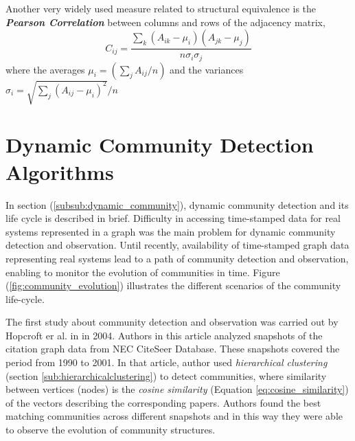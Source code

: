 Another very widely used measure related to structural equivalence is the \textbf{\textit{Pearson Correlation}} between columns and rows of the adjacency matrix,
\begin{equation}
C_{ij} = \dfrac{\sum\limits_{k} (A_{ik} - \mu_i) (A_{jk} - \mu_j)}{n \sigma_i \sigma_j}
\end{equation}
where the averages $\mu_i = (\sum\limits_j A_{ij} / n)$ and the variances $\sigma_i = \sqrt{\sum\limits_j (A_{ij} - \mu_i)^2} / n$

\section{Dynamic Community Detection Algorithms}\label{sec:dynamic_community_algorithms}
In section (\ref{subsub:dynamic_community}), dynamic community detection and its life cycle is described in brief. Difficulty in accessing time-stamped data for real systems represented in a graph was the main problem for dynamic community detection and observation. Until recently, availability of time-stamped graph data representing real systems lead to a path of community detection and observation, enabling to monitor the evolution of communities in time. Figure (\ref{fig:community_evolution}) illustrates the different scenarios of the community life-cycle.

The first study about community detection and observation was carried out by Hopcroft er al. in  \cite{ref-52} in 2004. Authors in this article analyzed snapshots of the citation graph data from NEC CiteSeer Database. These snapshots covered the period from 1990 to 2001. In that article, author used \textit{hierarchical clustering} (section \ref{sub:hierarchicalclustering}) to detect communities, where similarity between vertices (nodes) is the \textit{cosine similarity} (Equation \ref{eq:cosine_similarity}) of the vectors describing the corresponding papers. Authors found the best matching communities across different snapshots and in this way they were able to observe the evolution of community structures.

